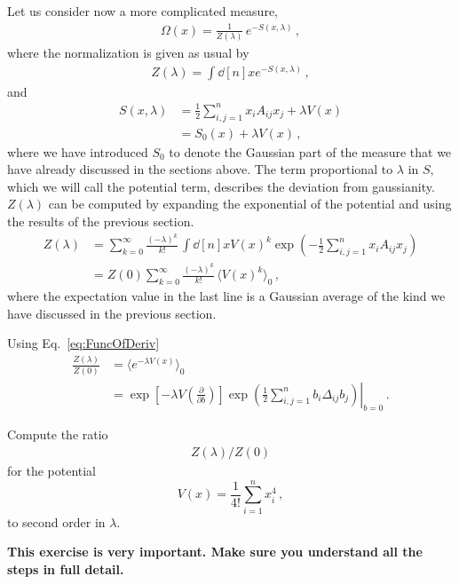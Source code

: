 \documentclass[notes.tex]{subfiles}
\begin{document}
Let us consider now a more complicated measure, 
\begin{align}
  \label{eq:PertGaussMeas}
  \Omega(x) = \frac{1}{Z(\lambda)}\, e^{-S(x,\lambda)}\, ,
\end{align}
where the normalization is given as usual by
\begin{align}
  \label{eq:PertGaussNorm}
  Z(\lambda) = \int \dd[n]{x} e^{-S(x,\lambda)}\, ,
\end{align}
and 
\begin{align}
  \label{eq:PertGaussAction}
  S(x,\lambda) &= \frac12 \sum_{i,j=1}^n x_i A_{ij} x_j + 
  \lambda V(x) \\
  &= S_0(x) + \lambda V(x)\, ,
\end{align}
where we have introduced $S_0$ to denote the Gaussian part of the
measure that we have already discussed in the sections above.  The
term proportional to $\lambda$ in $S$, which we will call the
potential term, describes the deviation from gaussianity.
$Z(\lambda)$ can be computed by expanding the exponential of the
potential and using the results of the previous section.
\begin{align}
  Z(\lambda) &= \sum_{k=0}^\infty \frac{(-\lambda)^k}{k!}\, 
               \int \dd[n]{x} V(x)^k  \exp\left(
    -\frac12 \sum_{i,j=1}^n x_i A_{ij} x_j
    \right) \\
  &= Z(0) \sum_{k=0}^\infty \frac{(-\lambda)^k}{k!}\,
    \langle V(x)^k\rangle_0\, ,
\end{align}
where the expectation value in the last line is a Gaussian average of the kind we have discussed in the previous section. 

Using Eq.~\ref{eq:FuncOfDeriv} 
\begin{align}
  \frac{Z(\lambda)}{Z(0)} &= \langle e^{-\lambda V(x)} \rangle_0 \\
  &= \exp\left[-\lambda V\left(\frac{\partial}{\partial b}\right)\right]
    \left. \exp\left(
    \frac12 \sum_{i,j=1}^n b_i \Delta_{ij} b_j
  \right) \right|_{b=0}\, .
\end{align}

\begin{Ex}
  Compute the ratio 
\begin{align}
  Z(\lambda)/Z(0)
\end{align}
for the potential 
\begin{equation}
  \label{eq:QuarticPot}
  V(x) = \frac{1}{4!} \sum_{i=1}^n x_i^4\, ,
\end{equation}
to second order in $\lambda$.

\noindent\textbf{ 
This exercise is very important. Make sure you understand all the steps in full detail. }
\end{Ex}
\end{document}
